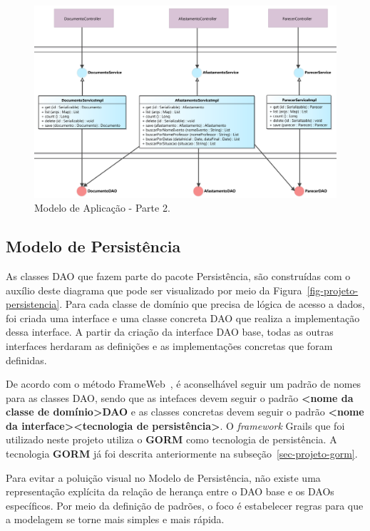 \begin{figure}[!h]
	\centering
	\includegraphics[width=1\textwidth]{figuras/fig-projeto-aplicacao2.png}
	\caption{Modelo de Aplicação - Parte 2.}
	\label{fig-projeto-aplicacao2}
\end{figure}
   

\subsection{Modelo de Persistência}
\label{sec-projeto-modelo-persistencia}

As classes DAO que fazem parte do pacote Persistência, são construídas com o auxílio deste diagrama que pode ser visualizado por meio da Figura~\ref{fig-projeto-persistencia}.
Para cada classe de domínio que precisa de lógica de acesso a dados, foi criada uma interface e uma classe concreta DAO que realiza a implementação dessa interface. A partir da criação da interface DAO base, todas as outras interfaces herdaram as definições e as implementações concretas que foram definidas.

De acordo com o método FrameWeb~\cite{souza:masterthesis07,souza-celebratingfalbo20}, é aconselhável seguir um padrão de nomes para as classes DAO, sendo que as intefaces devem seguir o padrão \textbf{<nome da classe de domínio>DAO} e as classes concretas devem seguir o padrão \textbf{<nome da interface><tecnologia de persistência>}. O \textit{framework} Grails que foi utilizado neste projeto utiliza o \textbf{GORM} como tecnologia de persistência. A tecnologia \textbf{GORM} já foi descrita anteriormente na subseção~\ref{sec-projeto-gorm}.

Para evitar a poluição visual no Modelo de Persistência, não existe uma representação explícita da relação de herança entre o DAO base e os DAOs específicos. Por meio da definição de padrões, o foco é estabelecer regras para que a modelagem se torne mais simples e mais rápida.    

